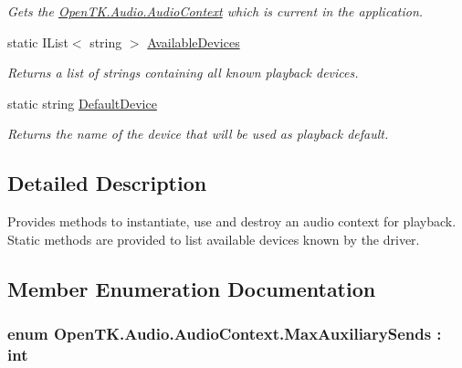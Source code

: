 \begin{DoxyCompactItemize}
\begin{DoxyCompactList}\small\item\em Gets the \hyperlink{class_open_t_k_1_1_audio_1_1_audio_context}{Open\-T\-K.\-Audio.\-Audio\-Context} which is current in the application. \end{DoxyCompactList}\item 
static I\-List$<$ string $>$ \hyperlink{class_open_t_k_1_1_audio_1_1_audio_context_ad4ab739b8e7f4568350d081b0b66bb96}{Available\-Devices}
\begin{DoxyCompactList}\small\item\em Returns a list of strings containing all known playback devices. \end{DoxyCompactList}\item 
static string \hyperlink{class_open_t_k_1_1_audio_1_1_audio_context_a9d503b9eaaca60548894f74113f897a1}{Default\-Device}
\begin{DoxyCompactList}\small\item\em Returns the name of the device that will be used as playback default. \end{DoxyCompactList}\end{DoxyCompactItemize}


\subsection{Detailed Description}
Provides methods to instantiate, use and destroy an audio context for playback. Static methods are provided to list available devices known by the driver. 



\subsection{Member Enumeration Documentation}
\hypertarget{class_open_t_k_1_1_audio_1_1_audio_context_a97c79a9ffc0910a0b644856cf82afdd8}{
\subsubsection[{Max\-Auxiliary\-Sends}]{\setlength{\rightskip}{0pt plus 5cm}enum {\bf Open\-T\-K.\-Audio.\-Audio\-Context.\-Max\-Auxiliary\-Sends} \-: int}}\label{class_open_t_k_1_1_audio_1_1_audio_context_a97c79a9ffc0910a0b644856cf82afdd8}


